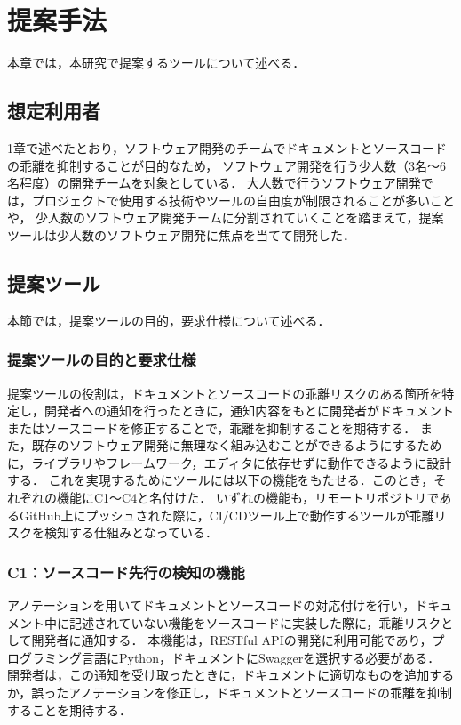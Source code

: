 \chapter{提案手法}
本章では，本研究で提案するツールについて述べる．

\section{想定利用者}
1章で述べたとおり，ソフトウェア開発のチームでドキュメントとソースコードの乖離を抑制することが目的なため，
ソフトウェア開発を行う少人数（3名〜6名程度）の開発チームを対象としている．
大人数で行うソフトウェア開発では，プロジェクトで使用する技術やツールの自由度が制限されることが多いことや，
少人数のソフトウェア開発チームに分割されていくことを踏まえて，提案ツールは少人数のソフトウェア開発に焦点を当てて開発した．

\section{提案ツール}
\label{tool}
本節では，提案ツールの目的，要求仕様について述べる．

\subsection{提案ツールの目的と要求仕様}
提案ツールの役割は，ドキュメントとソースコードの乖離リスクのある箇所を特定し，開発者への通知を行ったときに，通知内容をもとに開発者がドキュメントまたはソースコードを修正することで，乖離を抑制することを期待する．
また，既存のソフトウェア開発に無理なく組み込むことができるようにするために，ライブラリやフレームワーク，エディタに依存せずに動作できるように設計する．
これを実現するためにツールには以下の機能をもたせる．このとき，それぞれの機能にC1〜C4と名付けた．
いずれの機能も，リモートリポジトリであるGitHub上にプッシュされた際に，CI/CDツール上で動作するツールが乖離リスクを検知する仕組みとなっている．

\subsection{C1：ソースコード先行の検知の機能}
\label{c1}
アノテーションを用いてドキュメントとソースコードの対応付けを行い，ドキュメント中に記述されていない機能をソースコードに実装した際に，乖離リスクとして開発者に通知する．
本機能は，RESTful APIの開発に利用可能であり，プログラミング言語にPython，ドキュメントにSwaggerを選択する必要がある．
開発者は，この通知を受け取ったときに，ドキュメントに適切なものを追加するか，誤ったアノテーションを修正し，ドキュメントとソースコードの乖離を抑制することを期待する．

